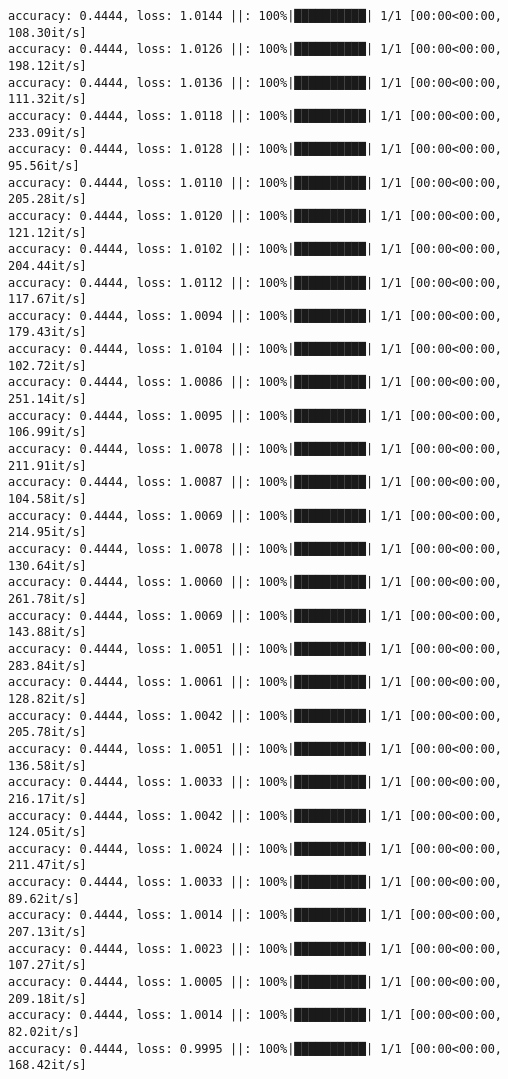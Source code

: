 \documentclass[
]{article}
\begin{document}
\begin{verbatim}
accuracy: 0.4444, loss: 1.0144 ||: 100%|██████████| 1/1 [00:00<00:00, 108.30it/s]
accuracy: 0.4444, loss: 1.0126 ||: 100%|██████████| 1/1 [00:00<00:00, 198.12it/s]
accuracy: 0.4444, loss: 1.0136 ||: 100%|██████████| 1/1 [00:00<00:00, 111.32it/s]
accuracy: 0.4444, loss: 1.0118 ||: 100%|██████████| 1/1 [00:00<00:00, 233.09it/s]
accuracy: 0.4444, loss: 1.0128 ||: 100%|██████████| 1/1 [00:00<00:00, 95.56it/s]
accuracy: 0.4444, loss: 1.0110 ||: 100%|██████████| 1/1 [00:00<00:00, 205.28it/s]
accuracy: 0.4444, loss: 1.0120 ||: 100%|██████████| 1/1 [00:00<00:00, 121.12it/s]
accuracy: 0.4444, loss: 1.0102 ||: 100%|██████████| 1/1 [00:00<00:00, 204.44it/s]
accuracy: 0.4444, loss: 1.0112 ||: 100%|██████████| 1/1 [00:00<00:00, 117.67it/s]
accuracy: 0.4444, loss: 1.0094 ||: 100%|██████████| 1/1 [00:00<00:00, 179.43it/s]
accuracy: 0.4444, loss: 1.0104 ||: 100%|██████████| 1/1 [00:00<00:00, 102.72it/s]
accuracy: 0.4444, loss: 1.0086 ||: 100%|██████████| 1/1 [00:00<00:00, 251.14it/s]
accuracy: 0.4444, loss: 1.0095 ||: 100%|██████████| 1/1 [00:00<00:00, 106.99it/s]
accuracy: 0.4444, loss: 1.0078 ||: 100%|██████████| 1/1 [00:00<00:00, 211.91it/s]
accuracy: 0.4444, loss: 1.0087 ||: 100%|██████████| 1/1 [00:00<00:00, 104.58it/s]
accuracy: 0.4444, loss: 1.0069 ||: 100%|██████████| 1/1 [00:00<00:00, 214.95it/s]
accuracy: 0.4444, loss: 1.0078 ||: 100%|██████████| 1/1 [00:00<00:00, 130.64it/s]
accuracy: 0.4444, loss: 1.0060 ||: 100%|██████████| 1/1 [00:00<00:00, 261.78it/s]
accuracy: 0.4444, loss: 1.0069 ||: 100%|██████████| 1/1 [00:00<00:00, 143.88it/s]
accuracy: 0.4444, loss: 1.0051 ||: 100%|██████████| 1/1 [00:00<00:00, 283.84it/s]
accuracy: 0.4444, loss: 1.0061 ||: 100%|██████████| 1/1 [00:00<00:00, 128.82it/s]
accuracy: 0.4444, loss: 1.0042 ||: 100%|██████████| 1/1 [00:00<00:00, 205.78it/s]
accuracy: 0.4444, loss: 1.0051 ||: 100%|██████████| 1/1 [00:00<00:00, 136.58it/s]
accuracy: 0.4444, loss: 1.0033 ||: 100%|██████████| 1/1 [00:00<00:00, 216.17it/s]
accuracy: 0.4444, loss: 1.0042 ||: 100%|██████████| 1/1 [00:00<00:00, 124.05it/s]
accuracy: 0.4444, loss: 1.0024 ||: 100%|██████████| 1/1 [00:00<00:00, 211.47it/s]
accuracy: 0.4444, loss: 1.0033 ||: 100%|██████████| 1/1 [00:00<00:00, 89.62it/s]
accuracy: 0.4444, loss: 1.0014 ||: 100%|██████████| 1/1 [00:00<00:00, 207.13it/s]
accuracy: 0.4444, loss: 1.0023 ||: 100%|██████████| 1/1 [00:00<00:00, 107.27it/s]
accuracy: 0.4444, loss: 1.0005 ||: 100%|██████████| 1/1 [00:00<00:00, 209.18it/s]
accuracy: 0.4444, loss: 1.0014 ||: 100%|██████████| 1/1 [00:00<00:00, 82.02it/s]
accuracy: 0.4444, loss: 0.9995 ||: 100%|██████████| 1/1 [00:00<00:00, 168.42it/s]

\end{verbatim}
\end{document}
